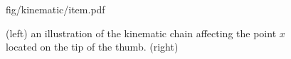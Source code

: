\begin{figure}[t!]
\centering
\begin{overpic} 
[width=\linewidth]
{fig/kinematic/item.pdf}
\end{overpic}
\caption{(left) an illustration of the kinematic chain affecting the point $x$ located on the tip of the thumb. (right) }
\label{fig:kinematic}
\end{figure}